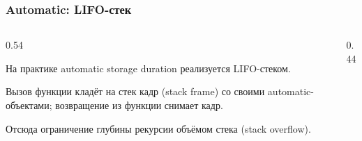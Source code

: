 \documentclass[compress, 8pt, aspectratio=169]{beamer}
\begin{document}
\begin{frame}[fragile]

    \frametitle{Automatic: LIFO-стек}

    \begin{columns}[T]

        \begin{column}{0.54\textwidth}

            \begin{myitemize}

                \item На практике automatic storage duration
                    реализуется LIFO-стеком.

                \item Вызов функции кладёт на стек кадр
                    (stack frame) со своими
                    automatic-объектами; возвращение из
                    функции снимает кадр.

                \item Отсюда ограничение глубины рекурсии
                    объёмом стека (stack overflow).

            \end{myitemize}

        \end{column}

        \begin{column}{0.44\textwidth}

            \begin{center}

\end{center}
\end{column}
\end{columns}
\end{frame}
\end{document}

